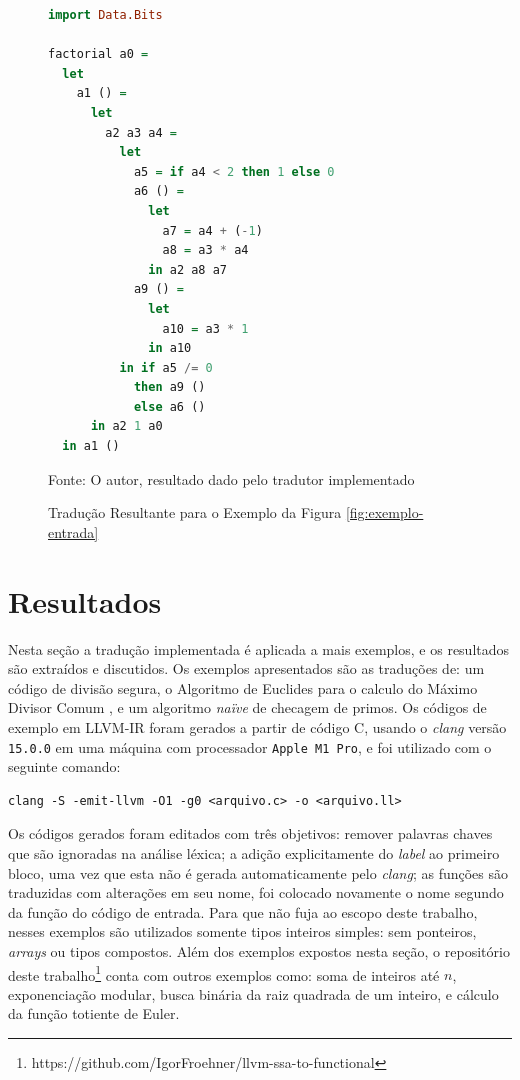 
\begin{figure}[h]
\centering
\lstset{xleftmargin=.24\textwidth}
\begin{lstlisting}[language=haskell,style=nasm]
import Data.Bits

factorial a0 =
  let
    a1 () =
      let
        a2 a3 a4 =
          let
            a5 = if a4 < 2 then 1 else 0
            a6 () =
              let
                a7 = a4 + (-1)
                a8 = a3 * a4
              in a2 a8 a7
            a9 () =
              let
                a10 = a3 * 1
              in a10 
          in if a5 /= 0
            then a9 ()
            else a6 ()
      in a2 1 a0
  in a1 ()
\end{lstlisting}
\caption{Tradução Resultante para o Exemplo da Figura \ref{fig:exemplo-entrada}}
\label{fig:exemplo-saida-haskell}
\small{Fonte: O autor, resultado dado pelo tradutor implementado}
\end{figure}

\section{Resultados}

Nesta seção a tradução implementada é aplicada a mais exemplos, e os resultados são extraídos e discutidos. Os exemplos apresentados são as traduções de: um código de divisão segura, o Algoritmo de Euclides para o calculo do Máximo Divisor Comum \cite{knuth2014art}, e um algoritmo \emph{naïve} de checagem de primos. Os códigos de exemplo em LLVM-IR foram gerados a partir de código C, usando o \emph{clang} versão \verb|15.0.0| em uma máquina com processador \verb|Apple M1 Pro|, e foi utilizado com o seguinte comando:

\begin{verbatim}
clang -S -emit-llvm -O1 -g0 <arquivo.c> -o <arquivo.ll>
\end{verbatim}

Os códigos gerados foram editados com três objetivos: remover palavras chaves que são ignoradas na análise léxica; a adição explicitamente do \emph{label} ao primeiro bloco, uma vez que esta não é gerada automaticamente pelo \emph{clang}; as funções são traduzidas com alterações em seu nome, foi colocado novamente o nome segundo da função do código de entrada. Para que não fuja ao escopo deste trabalho, nesses exemplos são utilizados somente tipos inteiros simples: sem ponteiros, \emph{arrays} ou tipos compostos. Além dos exemplos expostos nesta seção, o repositório deste trabalho\footnote{https://github.com/IgorFroehner/llvm-ssa-to-functional} conta com outros exemplos como: soma de inteiros até $n$, exponenciação modular, busca binária da raiz quadrada de um inteiro, e cálculo da função totiente de Euler.

